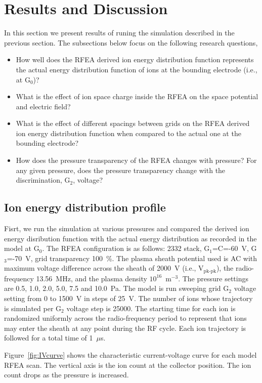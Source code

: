 \section{Results and Discussion}
In this section we present results of runing the simulation described in the previous section. The subsections below focus on the following research questions, 

\begin{itemize}
  \item How well does the RFEA derived ion energy distribution function represents the actual energy distribution function of ions at the bounding electrode (i.e., at G$_0$)? 
  \item What is the effect of ion space charge inside the RFEA on the space potential and electric field?  
  \item What is the effect of different spacings between grids on the RFEA derived ion energy distribution function when compared to the actual one at the bounding electrode?
  \item How does the pressure transparency of the RFEA changes with pressure? For any given pressure, does the pressure transparency change with the discrimination, G$_2$, voltage? 
\end{itemize}


\subsection{Ion energy distribution profile}
Fisrt, we run the simulation at various pressures and compared the derived ion energy disribution function with the actual energy distribution as recorded in the model at G$_0$. The RFEA configuration is as follows: 2332 stack, G$_1$=C=-60~V, G$_3$=-70~V, grid transparency 100~\%. The plasma sheath potential used is AC with maximum voltage difference across the sheath of 2000~V (i.e., V$_\text{pk-pk}$), the radio-frequency 13.56~MHz, and the plasma density $10^{16}$~m$^{-3}$. The pressure settings are 0.5, 1.0, 2.0, 5.0, 7.5 and 10.0~Pa. The model is run sweeping grid G$_2$ voltage setting from 0 to 1500~V in steps of 25~V. The number of ions whose trajectory is simulated per G$_2$ voltage step is 25000. The starting time for each ion is randomized uniformly across the radio-frequency period to represent that ions may enter the sheath at any point during the RF cycle. Each ion trajectory is followed for a total time of 1~$\mu$s. 

Figure~\ref{fig:IVcurve} shows the characteristic current-voltage curve for each model RFEA scan. The vertical axis is the ion count at the collector position. The ion count drops as the pressure is increased. 

